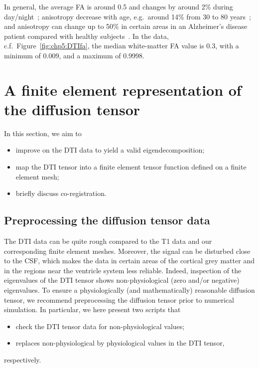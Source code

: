 In general, the average FA is around 0.5 and changes by around 2\%
during day/night~\cite{voldsbekk2020evidence}; anisotropy decrease
with age, e.g.~around 14\% from 30 to 80
years~\cite{kochunov2011fractional}; and anisotropy can change up to
50\% in certain areas in an Alzheimer's disease patient compared with
healthy subjects~\cite{naggara2006diffusion}. In the  data,
c.f.~Figure~\ref{fig:chp5:DTIfa}, the median white-matter FA value is
0.3, with a minimum of 0.009, and a maximum of 0.9998.

\section{A finite element representation of the diffusion tensor}

In this section, we aim to
\begin{itemize}
\item
  improve on the DTI data to yield a valid eigendecomposition;
\item
  map the DTI tensor into a finite element tensor function defined on
  a finite element mesh;
\item
  briefly discuss co-registration.
\end{itemize}

\subsection{Preprocessing the diffusion tensor data}

The DTI data can be quite rough compared to the T1 data and our
corresponding finite element meshes. Moreover, the signal can be
disturbed close to the CSF, which makes the data in certain areas of
the cortical grey matter and in the regions near the ventricle system
less reliable. Indeed, inspection of the eigenvalues of the DTI tensor
shows non-physiological (zero and/or negative) eigenvalues. To ensure
a physiologically (and mathematically) reasonable diffusion tensor, we
recommend preprocessing the diffusion tensor prior to numerical
simulation. In particular, we here present two scripts that
\begin{itemize}
\item
  check the DTI tensor data for non-physiological values;
\item
  replaces non-physiological by physiological values in the DTI tensor,
\end{itemize}
respectively.

